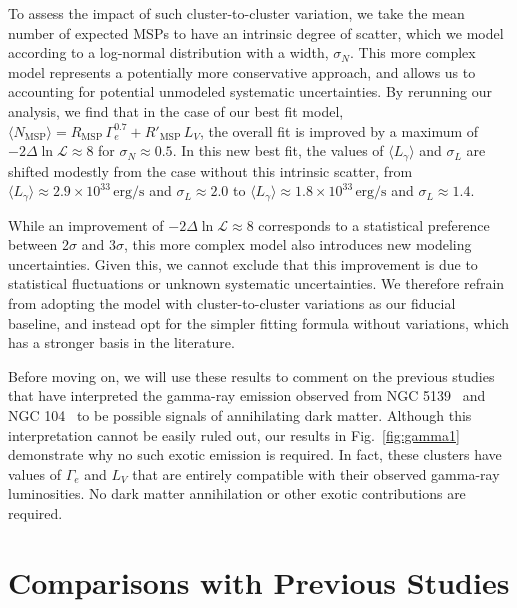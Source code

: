 \documentclass[a4paper,11pt]{article}
\begin{document}
To assess the impact of such cluster-to-cluster variation, we take the mean number of expected MSPs to have an intrinsic degree of scatter, which we model according to a log-normal distribution with a width, $\sigma_N$. This more complex model represents a potentially more conservative approach, and allows us to accounting for potential unmodeled systematic uncertainties. By rerunning our analysis, we find that in the case of our best fit model, $\langle N_\textrm{MSP}\rangle = R_\textrm{MSP} \, \Gamma_e^{0.7} +R'_\textrm{MSP} \, L_V$, the overall fit is improved by a maximum of $-2\Delta \ln \mathcal{L} \approx 8$ for $\sigma_N \approx 0.5$. In this new best fit, the values of $\langle L_{\gamma} \rangle$ and $\sigma_L$ are shifted modestly from the case without this intrinsic scatter, from $\langle L_{\gamma} \rangle \approx 2.9 \times 10^{33} \, \textrm{erg/s}$ and $\sigma_L \approx 2.0$ to $\langle L_{\gamma} \rangle \approx 1.8\times 10^{33} \, \textrm{erg/s}$ and $\sigma_L \approx 1.4$.

While an improvement of $-2\Delta \ln \mathcal{L} \approx 8$ corresponds to a statistical preference between 2$\sigma$ and 3$\sigma$, this more complex model also introduces new modeling uncertainties. Given this, we cannot exclude that this improvement is due to statistical fluctuations or unknown systematic uncertainties. We therefore refrain from adopting the model with cluster-to-cluster variations as our fiducial baseline, and instead opt for the simpler fitting formula without variations, which has a stronger basis in the literature.



Before moving on, we will use these results to comment on the previous studies that have interpreted the gamma-ray emission observed from NGC 5139~\cite{Reynoso-Cordova:2019biv} and NGC 104~\cite{Brown:2018pwq} to be possible signals of annihilating dark matter. Although this interpretation cannot be easily ruled out, our results in Fig.~\ref{fig:gamma1} demonstrate why no such exotic emission is required. In fact, these clusters have values of $\Gamma_e$ and $L_V$ that are entirely compatible with their observed gamma-ray luminosities. No dark matter annihilation or other exotic contributions are required.  


\section{Comparisons with Previous Studies}
\end{document}
